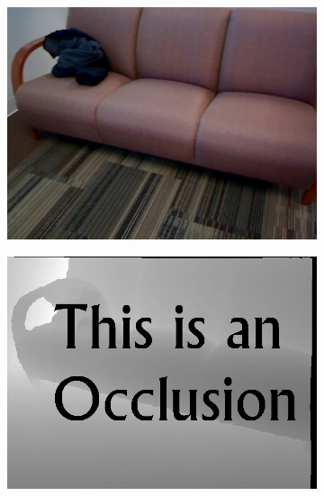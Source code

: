 \documentclass[preprint,10pt,5p,times,twocolumn]{elsarticle}
\begin{document}
\begin{figure}[t]
\begin{center}
\begin{subfigure}[b]{0.136\linewidth}
    \includegraphics[width=\linewidth]{sofa_structure_missing_color.png}
\end{subfigure}
\begin{subfigure}[b]{0.136\linewidth}
    \includegraphics[width=\linewidth]{sofa_structure_missing_depth.png}
\end{subfigure}
\begin{subfigure}[b]{0.136\linewidth}

\end{subfigure}
\end{center}
\end{figure}
\end{document}
